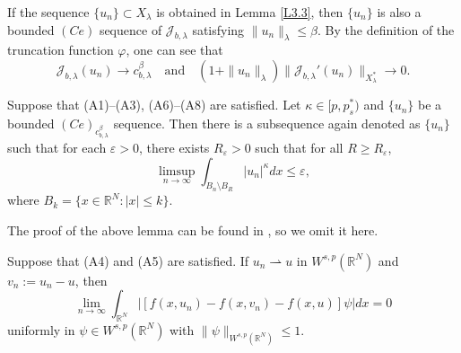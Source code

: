 \documentclass[reqno]{amsart}
\begin{document}
\begin{remark}  \label{rmk3.4} \rm
If the sequence $\{u_n\}\subset X_\lambda$ is obtained in Lemma \ref{L3.3}, 
then $\{u_n\}$ is also a bounded $(Ce)$ sequence of $\mathcal{J}_{b,\lambda}$ satisfying 
$\|u_n\|_\lambda\leq \beta$. By the definition of the truncation function $\varphi$, 
one can see that
\[
\mathcal{J}_{b,\lambda}(u_n)\to  c_{b,\lambda}^\beta\quad \text{and}\quad
 (1+\|u_n\|_\lambda)\|\mathcal{J}_{b,\lambda}'(u_n)\|_{X_\lambda^*}\to  0.
\]
\end{remark}

\begin{lemma}\label{L3.5}
Suppose that {\rm (A1)--(A3), (A6)--(A8)} are satisfied.
Let $\kappa\in[p, p^*_s)$ and $\{u_n\}$ be a bounded $(Ce)_{c_{b,\lambda}^\beta}$ 
sequence. Then there is a subsequence again denoted as $\{u_n\}$ such that for each 
$\varepsilon>0$, there exists $R_\varepsilon>0$ such that for all 
$R\geq R_\varepsilon$,
$$
\limsup_{n\to \infty}\int_{B_n\setminus B_R}|u_n|^\kappa dx\leq \varepsilon,
$$
where $B_k=\{x\in\mathbb{R}^N: |x|\leq k\}$.
\end{lemma}

The  proof of the above lemma can be found in  \cite{r15}, so we omit it here.

\begin{lemma}\label{L3.6}
Suppose that {\rm (A4)} and {\rm (A5)} are satisfied.
If $u_n \rightharpoonup u$ in $W^{s,p}(\mathbb{R}^N)$ and $v_n:=u_n-u$, then
$$
\lim_{n\to \infty}\int_{\mathbb{R}^N} |[f(x,u_n)-f(x,v_n)-f(x,u)]\psi|dx=0
$$
uniformly in $\psi\in W^{s,p}(\mathbb{R}^N)$ with 
$\|\psi\|_{W^{s,p}(\mathbb{R}^N)}\leq1$.
\end{lemma}
\end{document}
